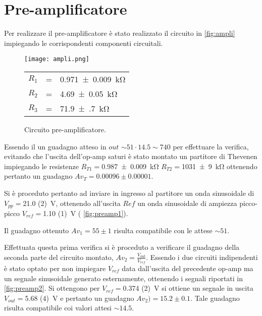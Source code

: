 \section{Pre-amplificatore}
	Per realizzare il pre-amplificatore è stato realizzato il circuito in 
	\figurename{ \ref{fig:ampli}} impiegando le corrispondenti componenti
	circuitali.
	
		\begin{figure}[h]
		\begin{minipage}{0.75\textwidth}
			\centering
			\texttt{[image: ampli.png]}
			\caption{Circuito pre-amplificatore.}
			\label{fig:pre}
		\end{minipage}
		\begin{minipage}{0.19\textwidth}
			\begin{tabular}{l@{ }c@{ }l}
				$R_{1}$& = &\SI{0.971(9)}{\kilo\ohm}\\
				$R_{2}$& = &\SI{4.69(5)}{\kilo\ohm}\\
				$R_3$& = &\SI{71.9(7)}{\kilo\ohm}\\
			\end{tabular}
		\end{minipage}
	\end{figure}
	Essendo il un guadagno atteso in $out$ $\sim 51 \cdot 14.5 \sim 740$ per effettuare
	la verifica, evitando che l'uscita dell'op-amp saturi è stato montato un partitore di 
	Thevenen
	impiegando le resistenze $R_{T1}=$\SI{0.987(9)}{\kilo\ohm} $R_{T2}=$\SI{1031(9)}{\kilo\ohm}
	ottenendo pertanto un guadagno  $Av_{T}=0.00096 \pm 0.00001$.
	
	Si è proceduto pertanto ad inviare in ingresso al partitore un onda sinusoidale di 
	$V_{pp}=$\SI{21.0 (2)}{\volt}, ottenendo all'uscita $Ref$ un onda sinusoidale di ampiezza
	picco-picco $V_{ref}=$\SI{1.10 (1)}{\volt} (\figurename{ \ref{fig:preamp1}}).
	
		
	Il guadagno ottenuto $Av_{1}= 55 \pm 1$ risulta compatibile con le attese $\sim 51$.
	
	Effettuata questa prima verifica si è proceduto a verificare il guadagno della seconda
	parte del circuito montato, $Av_{2}= \frac{V_{out}}{V_{ref}}$.
	Essendo i due circuiti indipendenti è stato optato per non impiegare $V_{ref}$ data dall'uscita 
	del precedente op-amp
	ma un segnale sinusoidale generato esternamente, ottenendo i segnali riportati in
	\figurename{ \ref{fig:preamp2}}.
	Si ottengono per $V_{ref}=$\SI{0.374 (2)}{\volt} si ottiene un segnale in uscita
	$V_{out}=$\SI{5.68 (4)}{\volt} e pertanto un guadagno $Av_{2})=15.2 \pm 0.1$.
	Tale guadagno risulta compatibile coi valori attesi $\sim 14.5$.
	
